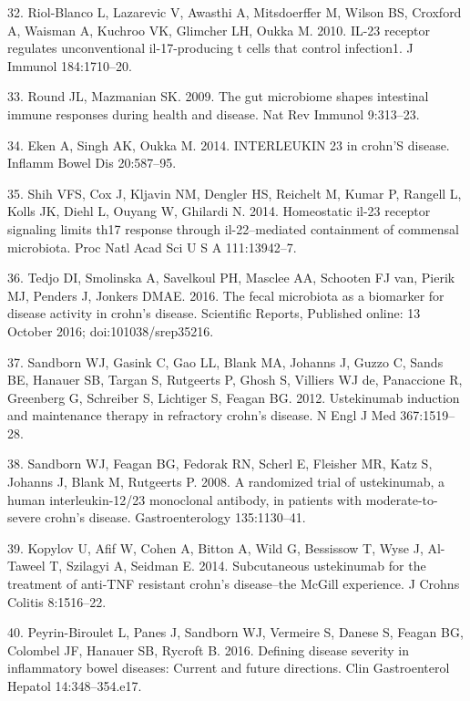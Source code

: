 \documentclass[12pt,]{article}
\begin{document}
\hypertarget{ref-Riol-Blanco_IL23microbiome_2010}{}
32. Riol-Blanco L, Lazarevic V, Awasthi A, Mitsdoerffer M, Wilson BS,
Croxford A, Waisman A, Kuchroo VK, Glimcher LH, Oukka M. 2010. IL-23
receptor regulates unconventional il-17-producing t cells that control
infection1. J Immunol 184:1710--20.

\hypertarget{ref-Round_IL23microbiome_2009}{}
33. Round JL, Mazmanian SK. 2009. The gut microbiome shapes intestinal
immune responses during health and disease. Nat Rev Immunol 9:313--23.

\hypertarget{ref-Eken_IL23CD_2014}{}
34. Eken A, Singh AK, Oukka M. 2014. INTERLEUKIN 23 in crohn'S disease.
Inflamm Bowel Dis 20:587--95.

\hypertarget{ref-Shih_IL23Th17_2014}{}
35. Shih VFS, Cox J, Kljavin NM, Dengler HS, Reichelt M, Kumar P,
Rangell L, Kolls JK, Diehl L, Ouyang W, Ghilardi N. 2014. Homeostatic
il-23 receptor signaling limits th17 response through il-22--mediated
containment of commensal microbiota. Proc Natl Acad Sci U S A
111:13942--7.

\hypertarget{ref-tedjo_CDactivity_2016}{}
36. Tedjo DI, Smolinska A, Savelkoul PH, Masclee AA, Schooten FJ van,
Pierik MJ, Penders J, Jonkers DMAE. 2016. The fecal microbiota as a
biomarker for disease activity in crohn's disease. Scientific Reports,
Published online: 13 October 2016; doi:101038/srep35216.

\hypertarget{ref-sandborn_ust_2012}{}
37. Sandborn WJ, Gasink C, Gao LL, Blank MA, Johanns J, Guzzo C, Sands
BE, Hanauer SB, Targan S, Rutgeerts P, Ghosh S, Villiers WJ de,
Panaccione R, Greenberg G, Schreiber S, Lichtiger S, Feagan BG. 2012.
Ustekinumab induction and maintenance therapy in refractory crohn's
disease. N Engl J Med 367:1519--28.

\hypertarget{ref-sandborn_ust_2008}{}
38. Sandborn WJ, Feagan BG, Fedorak RN, Scherl E, Fleisher MR, Katz S,
Johanns J, Blank M, Rutgeerts P. 2008. A randomized trial of
ustekinumab, a human interleukin-12/23 monoclonal antibody, in patients
with moderate-to-severe crohn's disease. Gastroenterology 135:1130--41.

\hypertarget{ref-kopylov_ust_2014}{}
39. Kopylov U, Afif W, Cohen A, Bitton A, Wild G, Bessissow T, Wyse J,
Al-Taweel T, Szilagyi A, Seidman E. 2014. Subcutaneous ustekinumab for
the treatment of anti-TNF resistant crohn's disease--the McGill
experience. J Crohns Colitis 8:1516--22.

\hypertarget{ref-PB_CDAI_2016}{}
40. Peyrin-Biroulet L, Panes J, Sandborn WJ, Vermeire S, Danese S,
Feagan BG, Colombel JF, Hanauer SB, Rycroft B. 2016. Defining disease
severity in inflammatory bowel diseases: Current and future directions.
Clin Gastroenterol Hepatol 14:348--354.e17.
\end{document}
